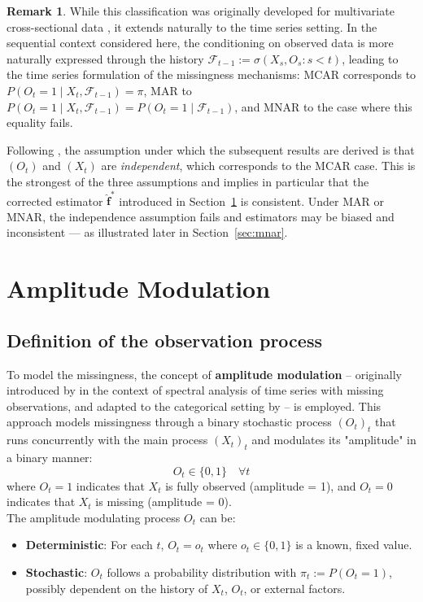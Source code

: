 ﻿\documentclass[12pt,a4paper]{scrreprt}
\theoremstyle{definition}
\newtheorem{remark}[theorem]{Remark}
\begin{document}
\begin{remark}
While this classification was originally developed for multivariate 
cross-sectional data \citep{Rubin1976}, it extends naturally to the 
time series setting. In the sequential context considered here, the 
conditioning on observed data is more naturally expressed through 
the history $\mathcal{F}_{t-1} := \sigma(X_s, O_s : s < t)$, 
leading to the time series formulation of the missingness mechanisms: 
MCAR corresponds to $P(O_t = 1 \mid X_t, \mathcal{F}_{t-1}) = \pi$, 
MAR to $P(O_t = 1 \mid X_t, \mathcal{F}_{t-1}) = P(O_t = 1 \mid 
\mathcal{F}_{t-1})$, and MNAR to the case where this equality fails.
\end{remark}
\noindent Following \citet{weiss2021categorical}, the assumption under which the subsequent results are derived is 
that $(O_t)$ and $(X_t)$ are \emph{independent}, which corresponds 
to the MCAR case. This is the strongest of the three assumptions 
and implies in particular that the corrected estimator 
$\hat{\boldsymbol{f}}^*$ introduced in Section~\ref{sec:Amp Mod} 
is consistent. Under MAR or MNAR, the independence assumption 
fails and estimators may be biased and inconsistent — as 
illustrated later in Section~\ref{sec:mnar}.

\section{Amplitude Modulation}\label{sec:Amp Mod}
\subsection*{Definition of the observation process}
To model the missingness, the concept of \textbf{amplitude modulation} --
originally introduced by \citet{Parzen1963} in the context of spectral
analysis of time series with missing observations, and adapted to the
categorical setting by \citet{weiss2021categorical} -- is employed. This approach models missingness through a binary stochastic process $(O_t)_t$ that runs concurrently with the main process $(X_t)_t$ and modulates its "amplitude"  in a binary manner:
\[
O_t \in \{0,1\} \quad \forall t
\]
where $O_t = 1$ indicates that $X_t$ is fully observed (amplitude = 1), and $O_t = 0$ indicates that $X_t$ is missing (amplitude = 0).\\
The amplitude modulating process $O_t$ can be:
\begin{itemize}
    \item \textbf{Deterministic}: For each $t$, $O_t = o_t$ where $o_t \in \{0,1\}$ is a known, fixed value.
    \item \textbf{Stochastic}: $O_t$ follows a probability distribution with $\pi_t := P(O_t=1)$, possibly dependent on the history of $X_t$, $O_t$, or external factors.
\end{itemize}
\end{document}
